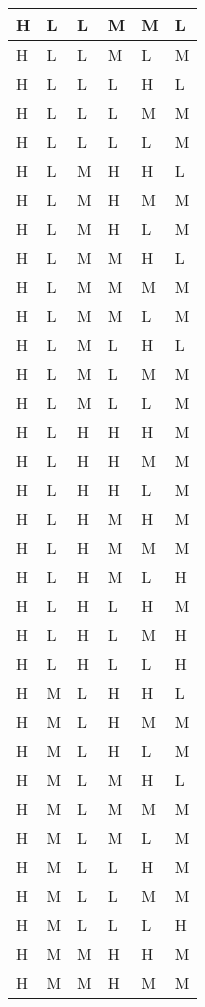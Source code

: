 \begin{center}
\begin{longtable}{| l | l | l | l | l | l |}
    H & L & L & M & M & L \\ \hline 
    H & L & L & M & L & M \\ \hline 
    H & L & L & L & H & L \\ \hline 
    H & L & L & L & M & M \\ \hline 
    H & L & L & L & L & M \\ \hline 
    H & L & M & H & H & L \\ \hline 
    H & L & M & H & M & M \\ \hline 
    H & L & M & H & L & M \\ \hline 
    H & L & M & M & H & L \\ \hline 
    H & L & M & M & M & M \\ \hline 
    H & L & M & M & L & M \\ \hline 
    H & L & M & L & H & L \\ \hline 
    H & L & M & L & M & M \\ \hline 
    H & L & M & L & L & M \\ \hline 
    H & L & H & H & H & M \\ \hline 
    H & L & H & H & M & M \\ \hline 
    H & L & H & H & L & M \\ \hline 
    H & L & H & M & H & M \\ \hline 
    H & L & H & M & M & M \\ \hline 
    H & L & H & M & L & H \\ \hline 
    H & L & H & L & H & M \\ \hline 
    H & L & H & L & M & H \\ \hline 
    H & L & H & L & L & H \\ \hline 
    H & M & L & H & H & L \\ \hline 
    H & M & L & H & M & M \\ \hline 
    H & M & L & H & L & M \\ \hline 
    H & M & L & M & H & L \\ \hline 
    H & M & L & M & M & M \\ \hline 
    H & M & L & M & L & M \\ \hline 
    H & M & L & L & H & M \\ \hline 
    H & M & L & L & M & M \\ \hline 
    H & M & L & L & L & H \\ \hline 
    H & M & M & H & H & M \\ \hline 
    H & M & M & H & M & M \\ \hline 

\end{longtable}
\end{center}
